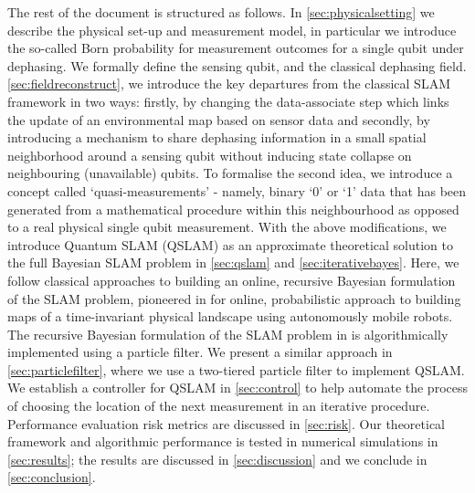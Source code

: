 The rest of the document is structured as follows. In \cref{sec:physicalsetting} we describe the physical set-up and measurement model, in particular we introduce the so-called Born probability for measurement outcomes for a single qubit under dephasing. We formally define the sensing qubit, and the classical dephasing field. \cref{sec:fieldreconstruct}, we introduce the key departures from the classical SLAM framework in two ways: firstly, by changing the data-associate step which links the update of an environmental map based on sensor data and secondly, by introducing a mechanism to share dephasing information in a small spatial neighborhood around a sensing qubit without inducing state collapse on neighbouring (unavailable) qubits. To formalise the second idea, we introduce a concept called `quasi-measurements' - namely, binary `0' or `1' data that has been generated from a mathematical procedure within this neighbourhood as opposed to a real physical single qubit measurement. With the above modifications, we introduce Quantum SLAM (QSLAM) as an approximate theoretical solution to the full Bayesian SLAM problem in \cref{sec:qslam} and \cref{sec:iterativebayes}. Here, we follow classical approaches to building an online, recursive Bayesian formulation of the SLAM problem, pioneered in \cite{thrun2001probabilistic} for online, probabilistic approach to building maps of a time-invariant physical landscape  using autonomously mobile robots. The recursive Bayesian formulation of the SLAM problem in \cite{thrun2001probabilistic} is algorithmically implemented using a particle filter. We present a similar approach in \cref{sec:particlefilter}, where we use a two-tiered particle filter to implement QSLAM. We establish a controller for QSLAM in \cref{sec:control} to help automate the process of choosing the location of the next measurement in an iterative procedure. Performance evaluation risk metrics are discussed in \cref{sec:risk}. Our theoretical framework and algorithmic performance is tested in numerical simulations in \cref{sec:results}; the results are discussed in \cref{sec:discussion} and we conclude in \cref{sec:conclusion}.
\\